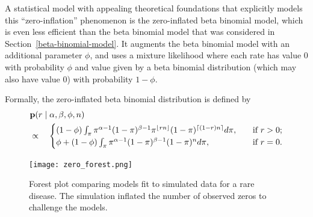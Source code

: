 A statistical model with appealing theoretical foundations that
explicitly models this ``zero-inflation'' phenomenon is the
zero-inflated beta binomial model, which is even less efficient than
the beta binomial model that was considered in
Section~\ref{beta-binomial-model}.  It augments the beta binomial
model with an additional parameter $\phi$, and uses a mixture
likelihood where each rate has value $0$ with probability $\phi$ and
value given by a beta binomial distribution (which may also have value
$0$) with probability $1-\phi$.

Formally, the zero-inflated beta binomial distribution is defined
by
\begin{align*}
&\mathbf{p}(r\;|\; \alpha, \beta, \phi, n)\\
&\propto\quad\begin{cases}
  (1-\phi)\int_{\pi} \pi^{\alpha-1}(1-\pi)^{\beta-1} \pi^{\lfloor
    rn\rfloor} (1-\pi)^{\lceil (1-r)n\rceil} d\pi, &\quad\text{if } r > 0; \\
  \phi + (1-\phi)\int_{\pi} \pi^{\alpha-1}(1-\pi)^{\beta-1}
  (1-\pi)^{n} d\pi, &\quad\text{if } r = 0.
\end{cases}
\end{align*}

\begin{figure}
\texttt{[image: zero\_forest.png]}
\caption{Forest plot comparing models fit to simulated data for a rare
  disease.  The simulation inflated the number of observed zeros to
  challenge the models.}
\label{zero-forest}
\end{figure}

